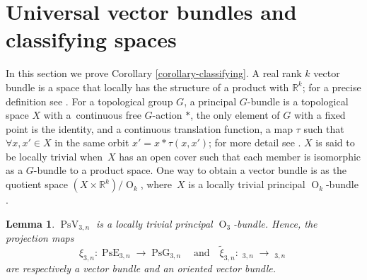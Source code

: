 \documentclass[JEP,XML,SOM,Unicode,NoFloatCountersInSection,published]{cedram}
\newtheorem{lemma}[theorem]{Lemma}
\theoremstyle{remark}
\let\mb\mathbb
\DeclareMathOperator{\pg}{PsG}
\DeclareMathOperator{\pog}{Ps\widetilde G}
\DeclareMathOperator{\pe}{PsE}
\DeclareMathOperator{\poe}{Ps\widetilde{E}}
\DeclareMathOperator{\orth}{O}
\DeclareMathOperator{\pstief}{PsV}
\begin{document}
\section{Universal vector bundles and classifying spaces}\label{section-bundles}

In this section we prove Corollary \ref{corollary-classifying}.
A real rank $k$ vector bundle is a space that locally has the structure of a product with $\mb{R}^k$;
for a precise definition see \hbox{\cite[p.\,24]{husemoller1994fibre}}.
For a topological group $G$, a principal $G$-bundle is a topological space $X$ with a~continuous free $G$-action $*$, \ie the only element of $G$ with a fixed point is the identity,
and a continuous translation function, \ie a map $\tau$ such that $\forall x,x' \in X$ in the same orbit $x' = x*\tau(x,x')$; for more detail see \cite[p.\,42]{husemoller1994fibre}.
$X$ is said to be locally trivial when~$X$ has an open cover such that each member is isomorphic as a $G$-bundle to a product space.
One way to obtain a vector bundle is as the quotient space $(X \times \mb{R}^k)/\orth_k$, where~$X$ is a locally trivial principal $\orth_k$-bundle \cite[Chap.\,5]{husemoller1994fibre}.

\begin{lemma}\label{lemma-principal-bundle}
$\pstief_{3,n}$ is a locally trivial principal $\orth_3$-bundle.
Hence, the projection maps
$$ \xi_{3,n}: \pe_{3,n} \to \pg_{3,n} \quad \text{and} \quad \widetilde\xi_{3,n}: \poe_{3,n} \to \pog_{3,n} $$
are respectively a vector bundle and an oriented vector bundle. \end{lemma}
\end{document}

